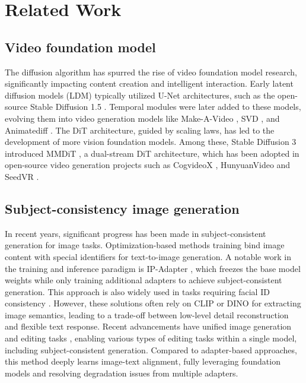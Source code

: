 \section{Related Work}
\label{sec:related_work}

\subsection{Video foundation model}
\label{sec:related_work:foundation}

The diffusion algorithm has spurred the rise of video foundation model research, significantly impacting content creation and intelligent interaction. Early latent diffusion models (LDM) \cite{rombach2022high} typically utilized U-Net \cite{ronneberger2015u} architectures, such as the open-source Stable Diffusion 1.5 \cite{rombach2022high}.  Temporal modules were later added to these models, evolving them into video generation models like Make-A-Video \cite{singer2022make}, SVD \cite{blattmann2023stable}, and Animatediff \cite{guo2023animatediff}. The DiT \cite{peebles2023scalable} architecture, guided by scaling laws, has led to the development of more vision foundation models. Among these, Stable Diffusion 3 introduced MMDiT \cite{esser2024scaling}, a dual-stream DiT architecture, which has been adopted in open-source video generation projects such as CogvideoX \cite{yang2024cogvideox}, HunyuanVideo \cite{kong2024hunyuanvideo} and SeedVR \cite{wang2025seedvr}.

\subsection{Subject-consistency image generation}
\label{sec:related_work:image}

In recent years, significant progress has been made in subject-consistent generation for image tasks. Optimization-based methods \cite{ruiz2023dreambooth, gal2022image, hu2021lora, shah2024ziplora, huang2024context} training bind image content with special identifiers for text-to-image generation. A notable work in the training and inference paradigm is IP-Adapter \cite{ye2023ip}, which freezes the base model weights while only training additional adapters to achieve subject-consistent generation. This approach is also widely used in tasks requiring facial ID consistency \cite{guo2024pulid, wang2024instantid, chen2024dreamidentity}. However, these solutions often rely on CLIP \cite{cherti2023reproducible} or DINO \cite{oquab2023dinov2} for extracting image semantics, leading to a trade-off between low-level detail reconstruction and flexible text response. Recent advancements have unified image generation and editing tasks \cite{chen2024unireal, xiao2024omnigen, erwold-2024-qwen2vl-flux, wanx_ace}, enabling various types of editing tasks within a single model, including subject-consistent generation. Compared to adapter-based approaches, this method deeply learns image-text alignment, fully leveraging foundation models and resolving degradation issues from multiple adapters.

